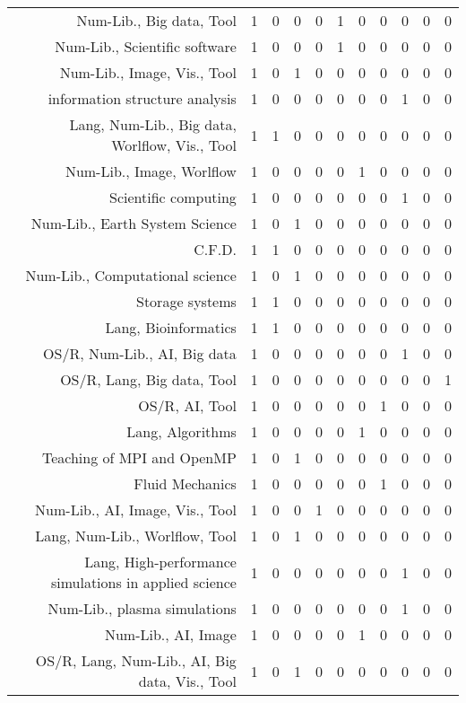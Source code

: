 {\begin{landscape}
\begin{longtable}[htb]{r|c|c|c|c|c|c|c|c|c|c}
{Num-Lib., Big data, Tool} & 1 & 0 & 0 & 0 & 1 & 0 & 0 & 0 & 0 & 0 \\%
{Num-Lib., Scientific software} & 1 & 0 & 0 & 0 & 1 & 0 & 0 & 0 & 0 & 0 \\%
{Num-Lib., Image, Vis., Tool} & 1 & 0 & 1 & 0 & 0 & 0 & 0 & 0 & 0 & 0 \\%
{information structure analysis} & 1 & 0 & 0 & 0 & 0 & 0 & 0 & 1 & 0 & 0 \\%
{Lang, Num-Lib., Big data, Worlflow, Vis., Tool} & 1 & 1 & 0 & 0 & 0 & 0 & 0 & 0 & 0 & 0 \\%
{Num-Lib., Image, Worlflow} & 1 & 0 & 0 & 0 & 0 & 1 & 0 & 0 & 0 & 0 \\%
{Scientific computing} & 1 & 0 & 0 & 0 & 0 & 0 & 0 & 1 & 0 & 0 \\%
{Num-Lib., Earth System Science} & 1 & 0 & 1 & 0 & 0 & 0 & 0 & 0 & 0 & 0 \\%
{C.F.D.} & 1 & 1 & 0 & 0 & 0 & 0 & 0 & 0 & 0 & 0 \\%
{Num-Lib., Computational science} & 1 & 0 & 1 & 0 & 0 & 0 & 0 & 0 & 0 & 0 \\%
{Storage systems} & 1 & 1 & 0 & 0 & 0 & 0 & 0 & 0 & 0 & 0 \\%
{Lang, Bioinformatics} & 1 & 1 & 0 & 0 & 0 & 0 & 0 & 0 & 0 & 0 \\%
{OS/R, Num-Lib., AI, Big data} & 1 & 0 & 0 & 0 & 0 & 0 & 0 & 1 & 0 & 0 \\%
{OS/R, Lang, Big data, Tool} & 1 & 0 & 0 & 0 & 0 & 0 & 0 & 0 & 0 & 1 \\%
{OS/R, AI, Tool} & 1 & 0 & 0 & 0 & 0 & 0 & 1 & 0 & 0 & 0 \\%
{Lang, Algorithms} & 1 & 0 & 0 & 0 & 0 & 1 & 0 & 0 & 0 & 0 \\%
{Teaching of MPI and OpenMP} & 1 & 0 & 1 & 0 & 0 & 0 & 0 & 0 & 0 & 0 \\%
{Fluid Mechanics} & 1 & 0 & 0 & 0 & 0 & 0 & 1 & 0 & 0 & 0 \\%
{Num-Lib., AI, Image, Vis., Tool} & 1 & 0 & 0 & 1 & 0 & 0 & 0 & 0 & 0 & 0 \\%
{Lang, Num-Lib., Worlflow, Tool} & 1 & 0 & 1 & 0 & 0 & 0 & 0 & 0 & 0 & 0 \\%
{Lang, High-performance simulations in applied science} & 1 & 0 & 0 & 0 & 0 & 0 & 0 & 1 & 0 & 0 \\%
{Num-Lib., plasma simulations} & 1 & 0 & 0 & 0 & 0 & 0 & 0 & 1 & 0 & 0 \\%
{Num-Lib., AI, Image} & 1 & 0 & 0 & 0 & 0 & 1 & 0 & 0 & 0 & 0 \\%
{OS/R, Lang, Num-Lib., AI, Big data, Vis., Tool} & 1 & 0 & 1 & 0 & 0 & 0 & 0 & 0 & 0 & 0 \\%

\end{longtable}
\end{landscape}}

